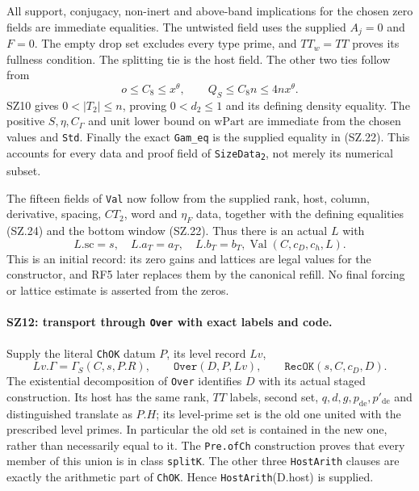 \documentclass[11pt,a4paper]{article}
\numberwithin{equation}{section}
\theoremstyle{remark}\newtheorem{remark}[theorem]{Remark}
\begin{document}
All support, conjugacy, non-inert and above-band implications for
the chosen zero fields are immediate equalities. The untwisted field
uses the supplied $A_j=0$ and $F=0$. The empty drop set excludes
every type prime, and $TT_w=TT$ proves its fullness condition.
The splitting tie is the host field. The other two ties follow from
\[
 o\leq C_8\leq x^\theta,\qquad
             Q_S\leq C_8n\leq4nx^\theta.
\]
SZ10 gives $0<|T_2|\leq n$, proving $0<d_2\leq1$ and its
defining density equality. The positive $S,\eta,C_\Gamma$ and
unit lower bound on $\mathrm{wPart}$ are immediate from the chosen
values and \texttt{Std}. Finally the exact
\texttt{Gam\_\allowbreak eq} is the supplied equality in (SZ.22).
This accounts for every data and proof field of
\texttt{SizeData\textsubscript{2}}, not merely its numerical subset.

The fifteen fields of \texttt{Val} now follow from the supplied rank,
host, column, derivative, spacing, $CT_2$, word and $\eta_F$ data,
together with the defining equalities (SZ.24) and the bottom window
(SZ.22). Thus there is an actual $L$ with
\[
      L.\mathrm{sc}=s,\quad L.a_T=a_T,\quad L.b_T=b_T,
                         \operatorname{Val}(C,c_D,c_h,L).       \tag{SZ.25}
\]
This is an initial record: its zero gains and lattices are legal
values for the constructor, and RF5 later replaces them by the
canonical refill. No final forcing or lattice estimate is asserted
from the zeros.

\paragraph{SZ12: transport through \texttt{Over} with exact labels and code.}
Supply the literal \texttt{ChOK} datum $P$, its level record $Lv$,
\[
 Lv.\Gamma=\Gamma_S(C,s,P.R),\qquad
             \texttt{Over}(D,P,Lv),\qquad\texttt{RecOK}(s,C,c_D,D).
                                                                    \tag{SZ.26}
\]
The existential decomposition of \texttt{Over} identifies $D$ with
its actual staged construction. Its host has the same rank, $TT$
labels, second set, $q,d,g,p_{\mathrm{de}},p'_{\mathrm{de}}$ and
distinguished translate as $P.H$; its level-prime set is the old
one united with the prescribed level primes. In particular the old
set is contained in the new one, rather than necessarily equal to it.
The \texttt{Pre.ofCh} construction proves that every member of this
union is in class \texttt{splitK}. The other three
\texttt{HostArith} clauses are exactly the arithmetic part of
\texttt{ChOK}. Hence \texttt{HostArith}(D.host) is supplied.
\end{document}
